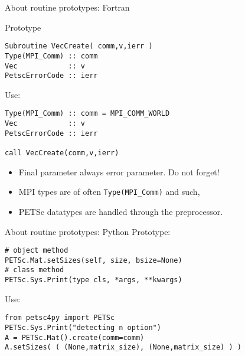 \lstset{language=Fortran}
\begin{frame}[containsverbatim]{About routine prototypes: Fortran}
\begin{multicols}{2}
\footnotesize
Prototype
\begin{lstlisting}
Subroutine VecCreate( comm,v,ierr )
Type(MPI_Comm) :: comm
Vec            :: v
PetscErrorCode :: ierr
\end{lstlisting}
Use:
\begin{lstlisting}
Type(MPI_Comm) :: comm = MPI_COMM_WORLD
Vec            :: v
PetscErrorCode :: ierr

call VecCreate(comm,v,ierr)
\end{lstlisting}
\columnbreak
\begin{itemize}
\item Final parameter always error parameter. Do not forget!
\item MPI types are of often \lstinline{Type(MPI_Comm)} and such,
\item PETSc datatypes are handled through the preprocessor.
\end{itemize}
\hbox{}\vfill\hbox{}
\end{multicols}
\end{frame}

\lstset{language=Python}
\begin{frame}[containsverbatim]{About routine prototypes: Python}
Prototype:
\begin{verbatim}
# object method
PETSc.Mat.setSizes(self, size, bsize=None)
# class method
PETSc.Sys.Print(type cls, *args, **kwargs)
\end{verbatim}
Use:
\begin{verbatim}
from petsc4py import PETSc
PETSc.Sys.Print("detecting n option")
A = PETSc.Mat().create(comm=comm)
A.setSizes( ( (None,matrix_size), (None,matrix_size) ) )
\end{verbatim}
\end{frame}

